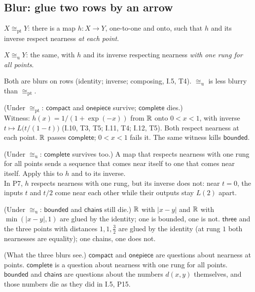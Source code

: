 \subsection*{Blur: glue two rows by an arrow}

\begin{lines}
\item[\lab{D8}] $X \cong_{\mathrm{pt}} Y$: there is a map $h : X \to Y$, one-to-one and onto, such that $h$ and its inverse respect nearness \emph{at each point}.
\item[\lab{D9}] $X \cong_{\mathrm{u}} Y$: the same, with $h$ and its inverse respecting nearness \emph{with one rung for all points}.
\item[\lab{P6}] Both are blurs on rows (identity; inverse; composing, I.5, T4). $\cong_{\mathrm{u}}$ is less blurry than $\cong_{\mathrm{pt}}$.
\item[\lab{P7}] (Under $\cong_{\mathrm{pt}}$: $\mathsf{compact}$ and $\mathsf{onepiece}$ survive; $\mathsf{complete}$ dies.) \\
Witness: $h(x) = 1/(1 + \exp(-x))$ from $\mathbb{R}$ onto $0 < x < 1$, with inverse $t \mapsto L\bigl(t/(1 - t)\bigr)$ (I.10, T3, T5; I.11, T4; I.12, T5). Both respect nearness at each point. $\mathbb{R}$ passes $\mathsf{complete}$; $0 < x < 1$ fails it. The same witness kills $\mathsf{bounded}$.
\item[\lab{P8}] (Under $\cong_{\mathrm{u}}$: $\mathsf{complete}$ survives too.) A map that respects nearness with one rung for all points sends a sequence that comes near itself to one that comes near itself. Apply this to $h$ and to its inverse. \\
In P7, $h$ respects nearness with one rung, but its inverse does not: near $t = 0$, the inputs $t$ and $t/2$ come near each other while their outputs stay $L(2)$ apart.
\item[\lab{P9}] (Under $\cong_{\mathrm{u}}$: $\mathsf{bounded}$ and $\mathsf{chains}$ still die.) $\mathbb{R}$ with $|x - y|$ and $\mathbb{R}$ with $\min(|x - y|, 1)$ are glued by the identity; one is bounded, one is not. $\mathsf{three}$ and the three points with distances $1, 1, \tfrac32$ are glued by the identity (at rung $1$ both nearnesses are equality); one chains, one does not.
\item[\lab{P10}] (What the three blurs see.) $\mathsf{compact}$ and $\mathsf{onepiece}$ are questions about nearness at points. $\mathsf{complete}$ is a question about nearness with one rung for all points. $\mathsf{bounded}$ and $\mathsf{chains}$ are questions about the numbers $d(x, y)$ themselves, and those numbers die as they did in I.5, P15.
\end{lines}

